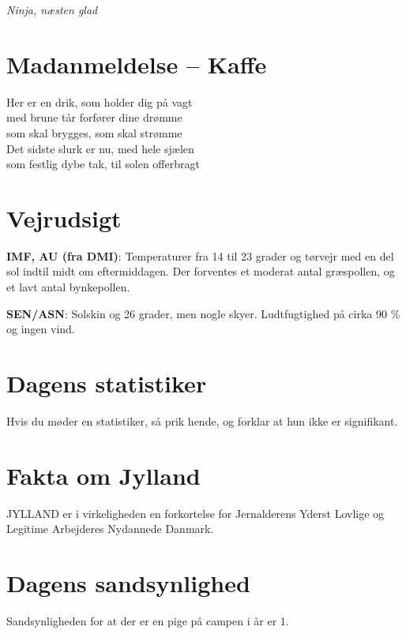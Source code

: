 \begin{minipage}[b]{0.95\linewidth}
\begin{minipage}[t]{0.47\textwidth}
{\flushright\emph{Ninja, næsten glad}}

\vspace{1mm}
\section*{Madanmeldelse -- Kaffe}

Her er en drik, som holder dig på vagt \\
med brune tår forfører dine drømme \\
som skal brygges, som skal strømme \\
Det sidste slurk er nu, med hele sjælen \\
som festlig dybe tak, til solen offerbragt

\end{minipage}%
\hfill\begin{minipage}[t]{0.47\textwidth}
\vspace{3mm}
\section*{Vejrudsigt}
\textbf{IMF, AU (fra DMI)}: Temperaturer fra 14 til 23 grader og tørvejr med en del sol indtil midt om eftermiddagen. Der forventes et moderat antal græspollen, og et lavt antal bynkepollen.

\textbf{SEN/ASN}: Solskin og 26 grader, men nogle skyer. Ludtfugtighed på cirka 90 \% og ingen vind.

\vspace{-2mm}
\section*{Dagens statistiker}
Hvis du møder en statistiker, så prik hende, og forklar at hun ikke er signifikant.

\vspace{-2mm}
\section*{Fakta om Jylland}
JYLLAND er i virkeligheden en forkortelse for Jernalderens Yderst Lovlige og Legitime Arbejderes Nydannede Danmark.

\vspace{-2mm}
\section*{Dagens sandsynlighed}
Sandsynligheden for at der er en pige på campen i år er $1$.


\end{minipage}
\end{minipage}
